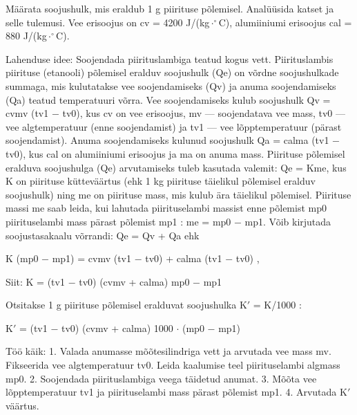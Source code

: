 
Määrata soojushulk, mis eraldub 1 g piirituse põlemisel. Analüüsida katset ja selle tulemusi. Vee erisoojus on cv = 4200 J/(kg$\cdot^\circ$C), alumiiniumi erisoojus cal = 880 J/(kg$\cdot^\circ$C).

\hint

\solu
Lahenduse idee: Soojendada piirituslambiga teatud kogus vett. Piirituslambis piirituse (etanooli) põlemisel eralduv soojushulk (Qe) on võrdne soojushulkade summaga, mis kulutatakse vee soojendamiseks (Qv) ja anuma soojendamiseks (Qa) teatud temperatuuri võrra. Vee soojendamiseks kulub soojushulk Qv = cvmv (tv1 $-$ tv0), kus cv on vee erisoojus, mv --- soojendatava vee mass, tv0 --- vee algtemperatuur (enne soojendamist) ja tv1 --- vee lõpptemperatuur (pärast soojendamist). Anuma soojendamiseks kulunud soojushulk Qa = calma (tv1 $-$ tv0), kus cal on alumiiniumi erisoojus ja ma on anuma mass. Piirituse põlemisel eralduva soojushulga (Qe) arvutamiseks tuleb kasutada valemit: Qe = Kme, kus K on piirituse kütteväärtus (ehk 1 kg piirituse täielikul põlemisel eralduv soojushulk) ning me on piirituse mass, mis kulub ära täielikul põlemisel. Piirituse massi me saab leida, kui lahutada piirituselambi massist enne põlemist mp0 piirituselambi mass pärast põlemist mp1 : me = mp0 $-$ mp1. Võib kirjutada soojustasakaalu võrrandi: Qe = Qv + Qa ehk

K (mp0 $-$ mp1) = cvmv (tv1 $-$ tv0) + calma (tv1 $-$ tv0) ,

Siit: K = (tv1 $-$ tv0) (cvmv + calma) mp0 $-$ mp1

Otsitakse 1 g piirituse põlemisel eralduvat soojushulka K$'$ = K/1000 :

K$'$ = (tv1 $-$ tv0) (cvmv + calma) 1000 $\cdot$ (mp0 $-$ mp1)

Töö käik: 1. Valada anumasse mõõtesilindriga vett ja arvutada vee mass mv. Fikseerida vee algtemperatuur tv0. Leida kaalumise teel piirituselambi algmass mp0. 2. Soojendada piirituslambiga veega täidetud anumat. 3. Mõõta vee lõpptemperatuur tv1 ja piirituselambi mass pärast põlemist mp1. 4. Arvutada K$'$ väärtus.
\probend
